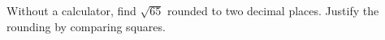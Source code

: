 Without a calculator, find $\sqrt{65}$ rounded to two decimal places. Justify the rounding by comparing squares.
